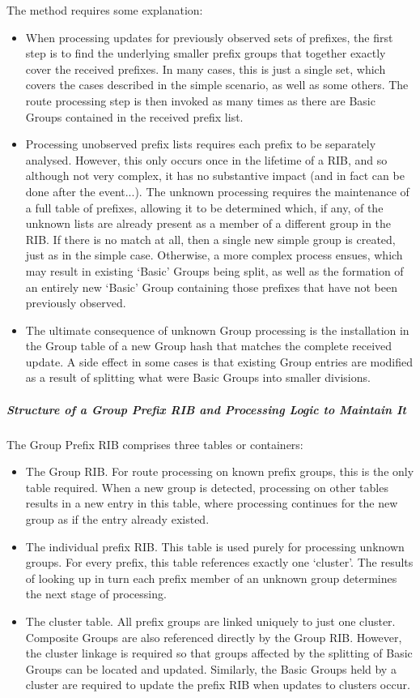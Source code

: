 The method requires some explanation:

\begin{itemize}
	\item When processing updates for previously observed sets of prefixes, the first step is to find the underlying smaller prefix groups that together exactly cover the received prefixes. In many cases, this is just a single set, which covers the cases described in the simple scenario, as well as some others. The route processing step is then invoked as many times as there are Basic Groups contained in the received prefix list.
	\item Processing unobserved prefix lists requires each prefix to be separately analysed. However, this only occurs once in the lifetime of a RIB, and so although not very complex, it has no substantive impact (and in fact can be done after the event...). The unknown processing requires the maintenance of a full table of prefixes, allowing it to be determined which, if any, of the unknown lists are already present as a member of a different group in the RIB. If there is no match at all, then a single new simple group is created, just as in the simple case. Otherwise, a more complex process ensues, which may result in existing `Basic' Groups being split, as well as the formation of an entirely new `Basic' Group containing those prefixes that have not been previously observed.
	\item The ultimate consequence of unknown Group processing is the installation in the Group table of a new Group hash that matches the complete received update. A side effect in some cases is that existing Group entries are modified as a result of splitting what were Basic Groups into smaller divisions.
\end{itemize}

\subparagraph{Structure of a Group Prefix RIB and Processing Logic to Maintain It}

The Group Prefix RIB comprises three tables or containers:

\begin{itemize}
	\item The Group RIB. For route processing on known prefix groups, this is the only table required. When a new group is detected, processing on other tables results in a new entry in this table, where processing continues for the new group as if the entry already existed.
	\item The individual prefix RIB. This table is used purely for processing unknown groups. For every prefix, this table references exactly one `cluster'. The results of looking up in turn each prefix member of an unknown group determines the next stage of processing.
	\item The cluster table. All prefix groups are linked uniquely to just one cluster. Composite Groups are also referenced directly by the Group RIB. However, the cluster linkage is required so that groups affected by the splitting of Basic Groups can be located and updated. Similarly, the Basic Groups held by a cluster are required to update the prefix RIB when updates to clusters occur.
\end{itemize}

